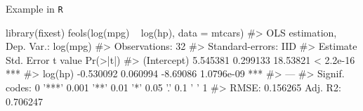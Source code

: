 \documentclass[aspectratio=169,t,11pt,table]{beamer}
\begin{document}
\begin{frame}{Example in \texttt{R}}
  \begin{codeblock}
library(fixest)
feols(log(mpg) ~ log(hp), data = mtcars)
#> OLS estimation, Dep. Var.: log(mpg)
#> Observations: 32
#> Standard-errors: IID 
#>              Estimate Std. Error  t value   Pr(>|t|)    
#> (Intercept)  5.545381   0.299133 18.53821  < 2.2e-16 ***
#> log(hp)     -0.530092   0.060994 -8.69086 1.0796e-09 ***
#> ---
#> Signif. codes:  0 '***' 0.001 '**' 0.01 '*' 0.05 '.' 0.1 ' ' 1
#> RMSE: 0.156265   Adj. R2: 0.706247
  \end{codeblock}
\end{frame}
\end{document}
